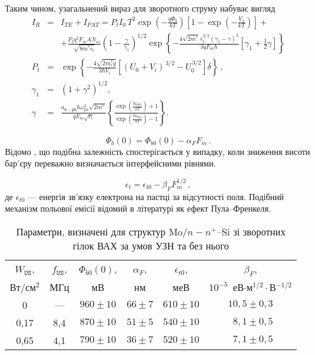 \documentclass[a5paper,10pt,twoside,openany,article]{memoir} %
\begin{document}
Таким чином, узагальнений вираз для зворотного струму набуває вигляд
\begin{eqnarray}
\label{eqIgen}
 I_R&=&I_{TE}+I_{P\!AT}=P_tI_0\,T^2\exp\left(-\frac{q\Phi_b}{kT}\right)\left[1-\exp\left(-\frac{V_s}{kT}\right)\right]+\\
 &&+\frac{P_tq^2F_mAN_{ss}}{\sqrt{8m^*\epsilon_t}}\left(1-\frac{\gamma}{\gamma_1}\right)^{1/2}\exp
    \left\{-\frac{4\sqrt{2m^*}\,\epsilon_t^{3/2}\left(\gamma_1-\gamma\right)^2}{3qF_m\hbar} \nonumber
    [\gamma_1+\frac{1}{2}\gamma]\right\}\\ \nonumber
        P_t&=&\exp\left\{-\frac{4\sqrt{2m_i^*q}}{3\hbar V_i}\left[(U_0+V_i)^{\,3/2}-U_0^{\,3/2}\right]\delta\right\}\,,\\ \nonumber
    \gamma_1&=&(1+\gamma^2)^{1/2},\\ \nonumber
    \gamma&=&\frac{a_\mathtt{e-ph}\hbar\omega_{ph}^2\sqrt{2m^*}}{qF_m\sqrt{\epsilon_t}}
    \left\{\frac{\exp\left(\frac{\hbar\omega_{ph}}{kT}\right)+1}{\exp\left(\frac{\hbar\omega_{ph}}{kT}\right)-1}\right\}.   \nonumber
\end{eqnarray}

\begin{equation}\label{eqFbE}
    \Phi_{b}(0)=\Phi_{b0}(0)-\alpha_{F} F_m\,.
\end{equation}
Відомо \cite{Tung:MSE},
що подібна залежність спостерігається у випадку, коли зниження висоти бар'єру переважно визначається інтерфейсними рівнями.

\begin{equation}\label{eqEtE}
    \epsilon_t=\epsilon_{t0}-\beta_F F_m^{1/2}\,,
\end{equation}
де
$\epsilon_{t0}$ --- енергія зв'язку електрона на пастці за відсутності поля.
Подібний механізм польової емісії відомий в літературі як ефект Пула--Френкеля.


\begin{table}
\caption{Параметри, визначені для структур Mo$/n-n^+$--Si зі зворотних гілок ВАХ за умов УЗН та без нього}
\label{tabSDBParZv}
\centering
\begin{tabular}{|c|c|c|c|c|c|}
\hline
$W_\mathtt{US}$, &$f_\mathtt{US}$,&$\Phi_{b0}(0)$,&$\alpha_F$,&$\epsilon_{t0}$,&$\beta_F$,\\
Вт/см$^2$&МГц&мВ&нм&меВ&$10^{-5}$~еВ$\cdot$м$^{1/2}\cdot$В$^{-1/2}$\\\hline
0&---&$960\pm10$&$66\pm7$&$610\pm10$&$10,5\pm0,3$\\\hline
0,17&8,4&$870\pm10$&$51\pm5$&$540\pm10$&$\;\:8,1\pm0,5$\\\hline
0,65&4,1&$790\pm10$&$36\pm7$&$520\pm10$&$\;\:7,1\pm0,5$\\\hline
\end{tabular}
\end{table}
\end{document}

